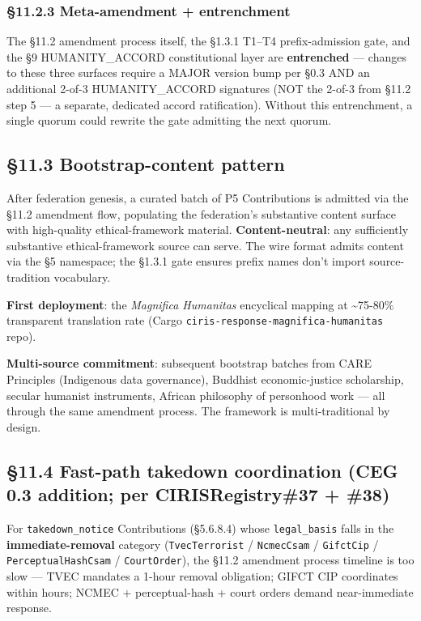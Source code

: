 \documentclass[10pt]{article}
\begin{document}
\subsubsection*{§11.2.3 Meta-amendment + entrenchment}


The §11.2 amendment process itself, the §1.3.1 T1–T4 prefix-admission gate, and the §9 HUMANITY\_ACCORD constitutional layer are \textbf{entrenched} — changes to these three surfaces require a MAJOR version bump per §0.3 AND an additional 2-of-3 HUMANITY\_ACCORD signatures (NOT the 2-of-3 from §11.2 step 5 — a separate, dedicated accord ratification). Without this entrenchment, a single quorum could rewrite the gate admitting the next quorum.


\subsection*{§11.3 Bootstrap-content pattern}


After federation genesis, a curated batch of P5 Contributions is admitted via the §11.2 amendment flow, populating the federation's substantive content surface with high-quality ethical-framework material. \textbf{Content-neutral}: any sufficiently substantive ethical-framework source can serve. The wire format admits content via the §5 namespace; the §1.3.1 gate ensures prefix names don't import source-tradition vocabulary.


\textbf{First deployment}: the \textit{Magnifica Humanitas} encyclical mapping at \textasciitilde{}75-80\% transparent translation rate (Cargo \texttt{ciris-response-magnifica-humanitas} repo).


\textbf{Multi-source commitment}: subsequent bootstrap batches from CARE Principles (Indigenous data governance), Buddhist economic-justice scholarship, secular humanist instruments, African philosophy of personhood work — all through the same amendment process. The framework is multi-traditional by design.


\subsection*{§11.4 Fast-path takedown coordination (CEG 0.3 addition; per CIRISRegistry\#37 + \#38)}


For \texttt{takedown\_notice} Contributions (§5.6.8.4) whose \texttt{legal\_basis} falls in the \textbf{immediate-removal} category (\texttt{TvecTerrorist} / \texttt{NcmecCsam} / \texttt{GifctCip} / \texttt{PerceptualHashCsam} / \texttt{CourtOrder}), the §11.2 amendment process timeline is too slow — TVEC mandates a 1-hour removal obligation; GIFCT CIP coordinates within hours; NCMEC + perceptual-hash + court orders demand near-immediate response.
\end{document}
